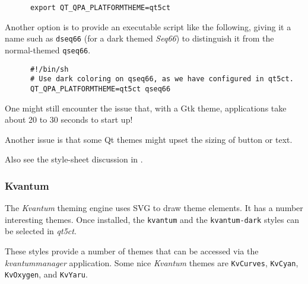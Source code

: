    \begin{verbatim}
      export QT_QPA_PLATFORMTHEME=qt5ct
   \end{verbatim}

   Another option is to provide an executable script like the following,
   giving it a name such as \texttt{dseq66}
   (for a dark themed \textsl{Seq66}) to
   distinguish it from the normal-themed \texttt{qseq66}.

   \begin{verbatim}
      #!/bin/sh
      # Use dark coloring on qseq66, as we have configured in qt5ct.
      QT_QPA_PLATFORMTHEME=qt5ct qseq66
   \end{verbatim}

   One might still encounter the issue that, with a Gtk theme, applications
   take about 20 to 30 seconds to start up!

   Another issue is that some Qt themes might upset the sizing of button or
   text.

   Also see the style-sheet discussion in
   .

\subsubsection{Kvantum}
\label{subsubsec:palettes_theming_kvantum}

   The \textsl{Kvantum} theming engine uses SVG to draw theme elements.
   It has a number interesting themes. Once installed,
   the \texttt{kvantum} and
   the \texttt{kvantum-dark}
   styles can be selected in \textsl{qt5ct}.

   These styles provide a number of themes that can be
   accessed via the \textsl{kvantummanager} application.
   Some nice \textsl{Kvantum} themes are \texttt{KvCurves},
   \texttt{KvCyan},
   \texttt{KvOxygen}, and
   \texttt{KvYaru}.

